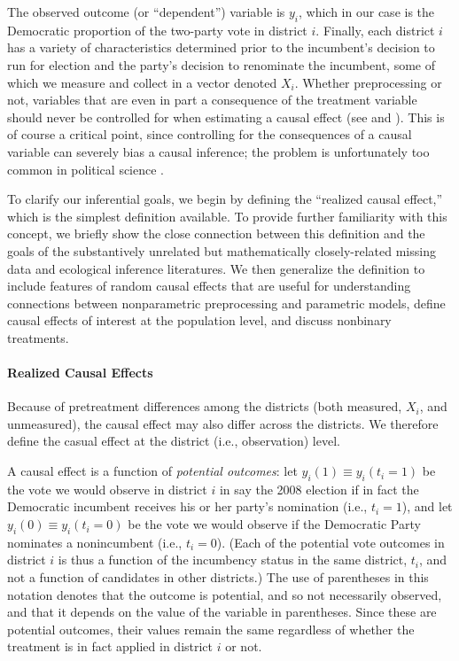 \documentclass[11pt,titlepage]{article}
\begin{document}
The observed outcome (or ``dependent'') variable is $y_i$, which in
our case is the Democratic proportion of the two-party vote in
district $i$.  Finally, each district $i$ has a variety of
characteristics determined prior to the incumbent's decision to run
for election and the party's decision to renominate the incumbent,
some of which we measure and collect in a vector denoted $X_i$.
Whether preprocessing or not, variables that are even in part a
consequence of the treatment variable should never be controlled for
when estimating a causal effect (see \citet[][Section 4.2]{Cox58} and
\citet[][pp.73--4]{Rosenbaum02}).  This is of course a critical point,
since controlling for the consequences of a causal variable can
severely bias a causal inference; the problem is unfortunately too
common in political science \citep{KinZen04}.

To clarify our inferential goals, we begin by defining the ``realized
causal effect,'' which is the simplest definition available.  To
provide further familiarity with this concept, we briefly show the
close connection between this definition and the goals of the
substantively unrelated but mathematically closely-related missing
data and ecological inference literatures.  We then generalize the
definition to include features of random causal effects that are
useful for understanding connections between nonparametric
preprocessing and parametric models, define causal effects of interest
at the population level, and discuss nonbinary treatments.

\paragraph{Realized Causal Effects}
Because of pretreatment differences among the districts (both
measured, $X_i$, and unmeasured), the causal effect may also differ
across the districts.  We therefore define the casual effect at the
district (i.e., observation) level.

A causal effect is a function of \emph{potential outcomes}: let
$y_i(1)\equiv y_i(t_i=1)$ be the vote we would observe in district $i$
in say the 2008 election if in fact the Democratic incumbent receives
his or her party's nomination (i.e., $t_i=1$), and let $y_i(0)\equiv
y_i(t_i=0)$ be the vote we would observe if the Democratic Party
nominates a nonincumbent (i.e., $t_i=0$).  (Each of the potential vote
outcomes in district $i$ is thus a function of the incumbency status
in the same district, $t_i$, and not a function of candidates in other
districts.)  The use of parentheses in this notation denotes that the
outcome is potential, and so not necessarily observed, and that it
depends on the value of the variable in parentheses.  Since these are
potential outcomes, their values remain the same regardless of whether
the treatment is in fact applied in district $i$ or not.  
\end{document}
